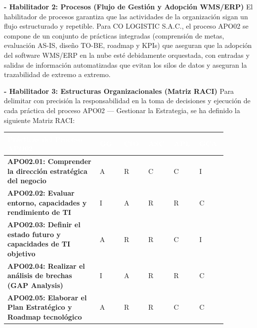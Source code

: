 \documentclass[11pt]{article}
\newcounter{none} %
\begin{document}
\textbf{- Habilitador 2: Procesos (Flujo de Gestión y Adopción WMS/ERP)}
El habilitador de procesos garantiza que las actividades de la organización sigan un flujo estructurado y repetible. Para CO LOGISTIC S.A.C., el proceso APO02 se compone de un conjunto de prácticas integradas (comprensión de metas, evaluación AS-IS, diseño TO-BE, roadmap y KPIs) que aseguran que la adopción del software WMS/ERP en la nube esté debidamente orquestada, con entradas y salidas de información automatizadas que evitan los silos de datos y aseguran la trazabilidad de extremo a extremo.

\textbf{- Habilitador 3: Estructuras Organizacionales (Matriz RACI)}
Para delimitar con precisión la responsabilidad en la toma de decisiones y ejecución de cada práctica del proceso APO02 --- Gestionar la Estrategia, se ha definido la siguiente Matriz RACI:

\vspace{0.3cm}
\setlength{\tabcolsep}{5pt}
\renewcommand{\arraystretch}{1.5}
{\def\LTcaptype{none}
\begin{longtable}[]{@{}
  >{\raggedright\arraybackslash}p{0.38\linewidth}
  >{\centering\arraybackslash}p{0.10\linewidth}
  >{\centering\arraybackslash}p{0.10\linewidth}
  >{\centering\arraybackslash}p{0.10\linewidth}
  >{\centering\arraybackslash}p{0.10\linewidth}
  >{\centering\arraybackslash}p{0.10\linewidth}@{}}
\rowcolor{DeepNavy}
\textcolor{white}{\textbf{Prácticas del Proceso APO02}} & \textcolor{white}{\textbf{GG}} & \textcolor{white}{\textbf{CIO}} & \textcolor{white}{\textbf{ASC}} & \textcolor{white}{\textbf{APL}} & \textcolor{white}{\textbf{GCA}} \\ \hline
\endhead
\textbf{APO02.01: Comprender la dirección estratégica del negocio} & A & R & C & C & I \\ \hline
\rowcolor{LightGray}
\textbf{APO02.02: Evaluar entorno, capacidades y rendimiento de TI} & I & A & R & R & C \\ \hline
\textbf{APO02.03: Definir el estado futuro y capacidades de TI objetivo} & A & R & R & C & I \\ \hline
\rowcolor{LightGray}
\textbf{APO02.04: Realizar el análisis de brechas (GAP Analysis)} & I & A & R & R & C \\ \hline
\textbf{APO02.05: Elaborar el Plan Estratégico y Roadmap tecnológico} & A & R & R & C & C \\ \hline
\end{longtable}
}
\end{document}
